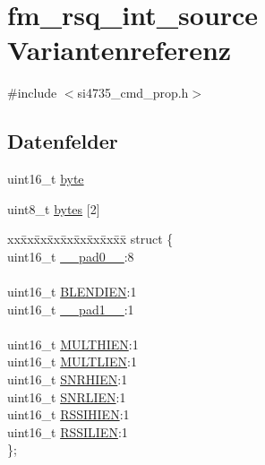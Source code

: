 \hypertarget{unionfm__rsq__int__source}{}\section{fm\+\_\+rsq\+\_\+int\+\_\+source Variantenreferenz}
\label{unionfm__rsq__int__source}


{\ttfamily \#include $<$si4735\+\_\+cmd\+\_\+prop.\+h$>$}

\subsection*{Datenfelder}
\begin{DoxyCompactItemize}
\item 
uint16\+\_\+t \hyperlink{unionfm__rsq__int__source_ab0549c1b5ea980a02e7eab77e21fea49}{byte}
\item 
uint8\+\_\+t \hyperlink{unionfm__rsq__int__source_a46e4c05d20a047ec169f60d3167e912e}{bytes} \mbox{[}2\mbox{]}
\item 
\begin{tabbing}
xx\=xx\=xx\=xx\=xx\=xx\=xx\=xx\=xx\=\kill
struct \{\\
\>uint16\_t \hyperlink{unionfm__rsq__int__source_a77132c2c26a75f5b8751b235cda23828}{\_\_pad0\_\_}:8\\
\>\\
\>uint16\_t \hyperlink{unionfm__rsq__int__source_a7b7709a5bcf7ccd961a3527020b8b6b3}{BLENDIEN}:1\\
\>uint16\_t \hyperlink{unionfm__rsq__int__source_ab72e3a1f2f7db8695c60c658f5a0f11a}{\_\_pad1\_\_}:1\\
\>\\
\>uint16\_t \hyperlink{unionfm__rsq__int__source_a55c9ae36251cd957e3521ababda535c1}{MULTHIEN}:1\\
\>uint16\_t \hyperlink{unionfm__rsq__int__source_a0100608b514d71a21fb69cd79e9dcd10}{MULTLIEN}:1\\
\>uint16\_t \hyperlink{unionfm__rsq__int__source_a024d64d4dd48191f3ac5fff26a4e780c}{SNRHIEN}:1\\
\>uint16\_t \hyperlink{unionfm__rsq__int__source_a1e8d526e51a38776582287db0a28c55c}{SNRLIEN}:1\\
\>uint16\_t \hyperlink{unionfm__rsq__int__source_a64ed8e38df22eeee47a0b56e90c538bc}{RSSIHIEN}:1\\
\>uint16\_t \hyperlink{unionfm__rsq__int__source_a1b6a2a337633a44012ed35381237e67f}{RSSILIEN}:1\\
\}; \\

\end{tabbing}\end{DoxyCompactItemize}


